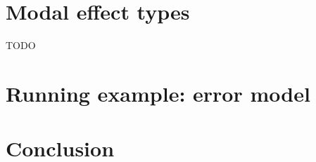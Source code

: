 \documentclass[conference]{IEEEtran}
\begin{document}
    \section{Modal effect types} \label{sec:modal}

    TODO \cite{convent2020doo}\cite{tang2024modal}



    \section{Running example: error model}



    \section{Conclusion}



%



    
    
\end{document}

